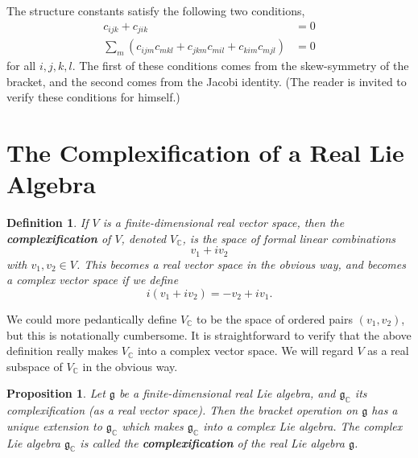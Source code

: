\documentclass[12pt]{amsbook}
\let \frak = \mathfrak
\theoremstyle{plain}
\newtheorem{definition}[theorem]{Definition}
\newtheorem{proposition}[theorem]{Proposition}
\numberwithin{equation}{chapter}
\numberwithin{theorem}{chapter}
\begin{document}
The structure constants satisfy the following two conditions,
\begin{align*}
c_{ijk}+c_{jik}  & =0\\
\sum_{m}(c_{ijm}c_{mkl}+c_{jkm}c_{mil}+c_{kim}c_{mjl})  & =0
\end{align*}
for all $i,j,k,l$. The first of these conditions comes from the skew-symmetry
of the bracket, and the second comes from the Jacobi identity. (The reader is
invited to verify these conditions for himself.)

\section{The Complexification of a Real Lie Algebra\label{complex}}

\begin{definition}
If $V$ is a finite-dimensional real vector space, then the
\textbf{complexification} of $V$, denoted $V_{\mathbb{C}}$, is the space of
formal linear combinations
\[
v_{1}+iv_{2}%
\]
with $v_{1},v_{2}\in V$. This becomes a real vector space in the obvious way,
and becomes a complex vector space if we define
\[
i(v_{1}+iv_{2})=-v_{2}+iv_{1}\text{.}%
\]
\end{definition}

We could more pedantically define $V_{\mathbb{C}}$ to be the space of ordered
pairs $(v_{1},v_{2})$, but this is notationally cumbersome. It is
straightforward to verify that the above definition really makes
$V_{\mathbb{C}} $ into a complex vector space. We will regard $V$ as a real
subspace of $V_{\mathbb{C}}$ in the obvious way.

\begin{proposition}
Let $\frak{g}$ be a finite-dimensional real Lie algebra, and \thinspace
$\frak{g}_{\mathbb{C}}$ its complexification (as a real vector space). Then
the bracket operation on $\frak{g}$ has a unique extension to $\frak{g}%
_{\mathbb{C}}$ which makes $\frak{g}_{\mathbb{C}}$ into a complex Lie algebra.
The complex Lie algebra $\frak{g}_{\mathbb{C}}$ is called the
\textbf{complexification} of the real Lie algebra $\frak{g}$.
\end{proposition}
\end{document}
